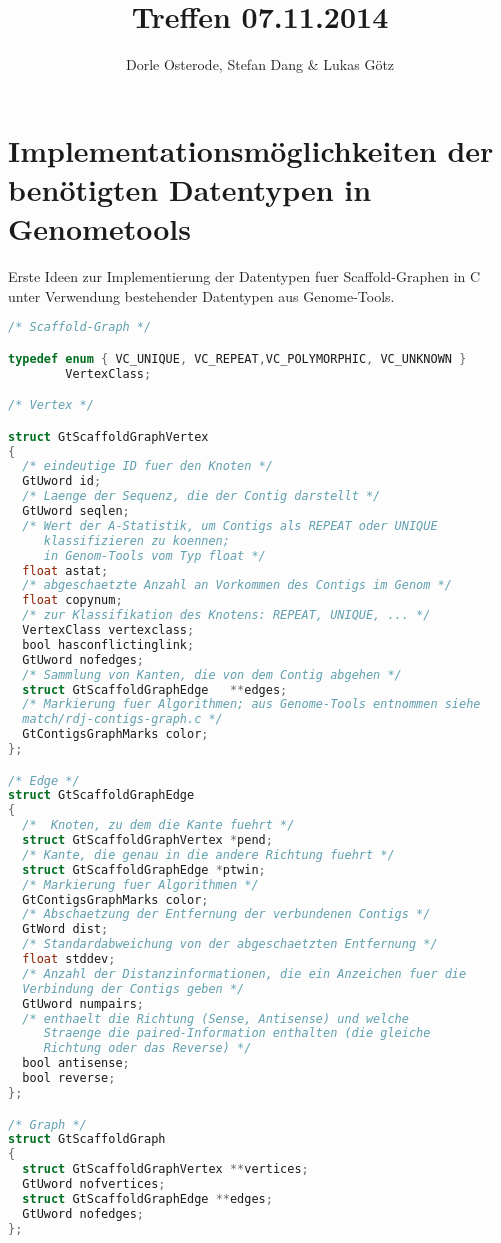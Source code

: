 \documentclass[a4paper,10pt,parskip]{scrartcl}
\title{Treffen 07.11.2014}
\author{Dorle Osterode, Stefan Dang \& Lukas Götz}
\begin{document}
\maketitle{}

\section{Implementationsmöglichkeiten der benötigten Datentypen in Genometools}

Erste Ideen zur Implementierung der Datentypen fuer Scaffold-Graphen in C unter
Verwendung bestehender Datentypen aus Genome-Tools.

\begin{lstlisting}[language=C]
/* Scaffold-Graph */

typedef enum { VC_UNIQUE, VC_REPEAT,VC_POLYMORPHIC, VC_UNKNOWN }
	 	VertexClass;

/* Vertex */

struct GtScaffoldGraphVertex
{
  /* eindeutige ID fuer den Knoten */
  GtUword id;
  /* Laenge der Sequenz, die der Contig darstellt */
  GtUword seqlen;
  /* Wert der A-Statistik, um Contigs als REPEAT oder UNIQUE
     klassifizieren zu koennen;
     in Genom-Tools vom Typ float */
  float astat;
  /* abgeschaetzte Anzahl an Vorkommen des Contigs im Genom */
  float copynum;
  /* zur Klassifikation des Knotens: REPEAT, UNIQUE, ... */
  VertexClass vertexclass;
  bool hasconflictinglink;
  GtUword nofedges;
  /* Sammlung von Kanten, die von dem Contig abgehen */
  struct GtScaffoldGraphEdge   **edges;
  /* Markierung fuer Algorithmen; aus Genome-Tools entnommen siehe
  match/rdj-contigs-graph.c */
  GtContigsGraphMarks color;
};

/* Edge */
struct GtScaffoldGraphEdge
{
  /*  Knoten, zu dem die Kante fuehrt */
  struct GtScaffoldGraphVertex *pend;
  /* Kante, die genau in die andere Richtung fuehrt */
  struct GtScaffoldGraphEdge *ptwin;
  /* Markierung fuer Algorithmen */
  GtContigsGraphMarks color;
  /* Abschaetzung der Entfernung der verbundenen Contigs */
  GtWord dist;
  /* Standardabweichung von der abgeschaetzten Entfernung */
  float stddev;
  /* Anzahl der Distanzinformationen, die ein Anzeichen fuer die
  Verbindung der Contigs geben */
  GtUword numpairs;
  /* enthaelt die Richtung (Sense, Antisense) und welche
     Straenge die paired-Information enthalten (die gleiche
     Richtung oder das Reverse) */
  bool antisense;
  bool reverse;
};

/* Graph */
struct GtScaffoldGraph
{
  struct GtScaffoldGraphVertex **vertices;
  GtUword nofvertices;
  struct GtScaffoldGraphEdge **edges;
  GtUword nofedges;
};
\end{lstlisting}
\end{document}
